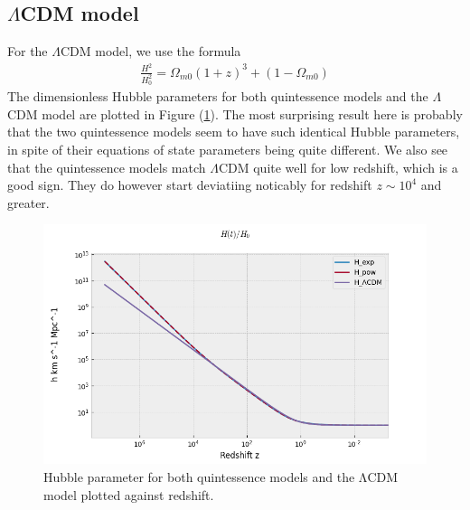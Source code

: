 \documentclass[reprint,english,notitlepage,nofootinbib]{revtex4-1}  %
\numberwithin{equation}{section}
\begin{document}
\subsection{$\Lambda$CDM model}
For the $\Lambda$CDM model, we use the formula
\begin{align}
	\frac{H^2}{H^2_0} = \Omega_{m0}(1+z)^3 + (1-\Omega_{m0})
\end{align}
The dimensionless Hubble parameters for both quintessence models and the
$\Lambda$CDM model are plotted in Figure (\ref{fig:hubble}). The most surprising
result here is probably that the two quintessence models seem to have such identical
Hubble parameters, in spite of their equations of state parameters being quite different.
We also see that the quintessence models match $\Lambda$CDM quite well for low
redshift, which is a good sign. They do however start deviatiing noticably for
redshift $z\sim10^4$ and greater.

\begin{figure}[h!]
	\includegraphics[scale=0.4]{Hubble_param.png}
	\caption{Hubble parameter for both quintessence models and the ΛCDM model plotted
	against redshift.}
	\label{fig:hubble}
\end{figure}
\end{document}
